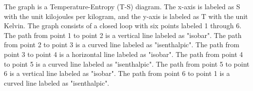 The graph is a Temperature-Entropy (T-S) diagram. The x-axis is labeled as S with the unit kilojoules per kilogram, and the y-axis is labeled as T with the unit Kelvin. The graph consists of a closed loop with six points labeled 1 through 6. The path from point 1 to point 2 is a vertical line labeled as "isobar". The path from point 2 to point 3 is a curved line labeled as "isenthalpic". The path from point 3 to point 4 is a horizontal line labeled as "isobar". The path from point 4 to point 5 is a curved line labeled as "isenthalpic". The path from point 5 to point 6 is a vertical line labeled as "isobar". The path from point 6 to point 1 is a curved line labeled as "isenthalpic".